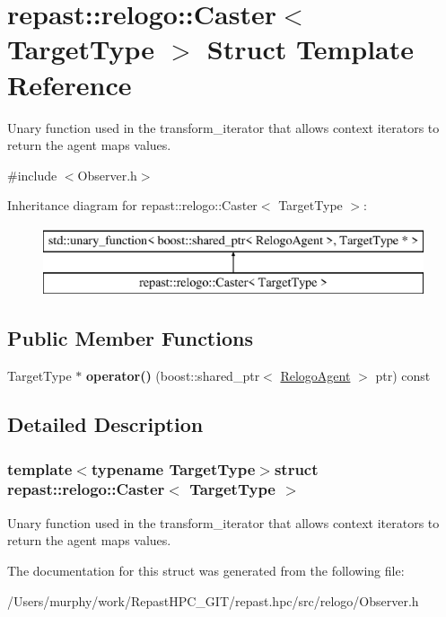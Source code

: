 \hypertarget{structrepast_1_1relogo_1_1_caster}{\section{repast\-:\-:relogo\-:\-:Caster$<$ Target\-Type $>$ Struct Template Reference}
\label{structrepast_1_1relogo_1_1_caster}
}


Unary function used in the transform\-\_\-iterator that allows context iterators to return the agent maps values.  




{\ttfamily \#include $<$Observer.\-h$>$}

Inheritance diagram for repast\-:\-:relogo\-:\-:Caster$<$ Target\-Type $>$\-:\begin{figure}[H]
\begin{center}
\leavevmode
\includegraphics[height=2.000000cm]{structrepast_1_1relogo_1_1_caster}
\end{center}
\end{figure}
\subsection*{Public Member Functions}
\begin{DoxyCompactItemize}
\item 
\hypertarget{structrepast_1_1relogo_1_1_caster_ad472a8ecc1aa129b9c35728d44ce9940}{Target\-Type $\ast$ {\bfseries operator()} (boost\-::shared\-\_\-ptr$<$ \hyperlink{classrepast_1_1relogo_1_1_relogo_agent}{Relogo\-Agent} $>$ ptr) const }\label{structrepast_1_1relogo_1_1_caster_ad472a8ecc1aa129b9c35728d44ce9940}

\end{DoxyCompactItemize}


\subsection{Detailed Description}
\subsubsection*{template$<$typename Target\-Type$>$struct repast\-::relogo\-::\-Caster$<$ Target\-Type $>$}

Unary function used in the transform\-\_\-iterator that allows context iterators to return the agent maps values. 

The documentation for this struct was generated from the following file\-:\begin{DoxyCompactItemize}
\item 
/\-Users/murphy/work/\-Repast\-H\-P\-C\-\_\-\-G\-I\-T/repast.\-hpc/src/relogo/Observer.\-h\end{DoxyCompactItemize}
